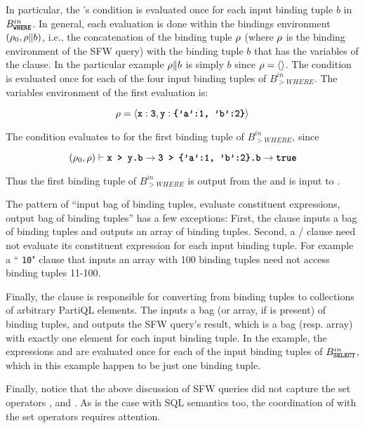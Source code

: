In particular, the 's condition is evaluated once for each input
binding tuple $b$ in $B^{in}_{\texttt{\textbf{WHERE}}}$. In general, each evaluation is done
within the bindings environment $(\rho_{0}, \rho \| b)$, i.e., the concatenation of
the binding tuple $\rho$ (where $\rho$ is the binding environment of the SFW
query) with the binding tuple $b$ that has the variables of the 
clause. In the particular example $\rho \| b$ is simply $b$ since $\rho =
\langle \rangle$. The condition  is evaluated once for each of the
four input binding tuples of $B^{in}_{\gt{WHERE}}$. The variables environment of
the first evaluation is:

\[ 
\rho = \langle \texttt{\textbf{x}}:\texttt{\textbf{3}}, \texttt{\textbf{y}}:\texttt{\textbf{\{'a':1, 'b':2\}}} \rangle 
\] 

\noindent The  condition evaluates to  for the first
binding tuple of  $B^{in}_{\gt{WHERE}}$, since 

\[ (\rho_{0}, \rho) \vdash \texttt{\textbf{x > y.b}} \rightarrow \texttt{\textbf{3 > \{'a':1, 'b':2\}.b}} \rightarrow \texttt{\textbf{true}} \]

\noindent Thus the first binding tuple of $B^{in}_{\gt{WHERE}}$ is output from
the  and is input to .

The pattern of ``input bag of binding tuples, evaluate constituent expressions,
output bag of binding tuples'' has a few exceptions: First, the 
clause inputs a bag of binding tuples and outputs an array of binding tuples.
Second, a / clause need not evaluate its constituent
expression for each input binding tuple. For example a `` \texttt{10}"
clause that inputs an array with 100 binding tuples need not access binding
tuples 11-100. 

Finally, the  clause is responsible for converting from binding
tuples to collections of arbitrary PartiQL elements. The  inputs a
bag (or array, if  is present) of binding tuples, and outputs
the SFW query's result, which is a bag (resp. array) with exactly one element
for each input binding tuple. In the example, the  expressions 
and  are evaluated once for each of the input binding tuples of
$B^{in}_{\texttt{\textbf{SELECT}}}$, which in this example happen to be just one binding
tuple.

Finally, notice that the above discussion of SFW queries did not capture the set
operators ,  and . As is the case with SQL
semantics too, the coordination of  with the set operators requires
attention. 

